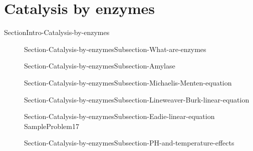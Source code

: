 \documentclass[main.tex]{subfiles}
\begin{document}
\section{Catalysis by enzymes} {SectionIntro-Catalysis-by-enzymes}
\sloppy \begin{description}
\item[]  {Section-Catalysis-by-enzymesSubsection-What-are-enzymes}
\begin{minipage}[b]{1.0\linewidth}\end{minipage}
\item[]  {Section-Catalysis-by-enzymesSubsection-Amylase}  
\begin{fullwidth}\begin{center}\begin{minipage}[b]{1\linewidth}\end{minipage} \end{center}\end{fullwidth}
\item[]  {Section-Catalysis-by-enzymesSubsection-Michaelis-Menten-equation}
\item[]  {Section-Catalysis-by-enzymesSubsection-Lineweaver-Burk-linear-equation}
\begin{center}\begin{minipage}[b]{1\linewidth}\end{minipage} \end{center}
\item[]  {Section-Catalysis-by-enzymesSubsection-Eadie-linear-equation}
{SampleProblem17}

\item[]  {Section-Catalysis-by-enzymesSubsection-PH-and-temperature-effects}

  \end{description}



\checkoddpage\ifoddpage \clearpage\thispagestyle{empty}\mbox{}\clearpage \else  \fi 
\end{document}

